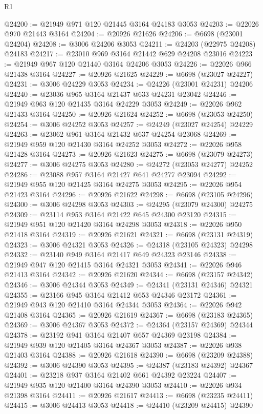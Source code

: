 \begin{lexlean}{R1}
\begin{coremodule}
@24200 := @21949 @971 @120 @21445 @3164 @24183 @3053
@24203 := @22026 @970 @21443 @3164
@24204 := @20926 @21626
@24206 := @6698 (@23001 @24204)
@24208 := @3006 @24206 @3053
@24211 := @24203 (@22975 @24208) @24183
@24217 := @23010 @969 @3164 @21442 @629 @24208 @23016
@24223 := @21949 @967 @120 @21440 @3164 @24206 @3053
@24226 := @22026 @966 @21438 @3164
@24227 := @20926 @21625
@24229 := @6698 (@23027 @24227)
@24231 := @3006 @24229 @3053
@24234 := @24226 (@23001 @24231) @24206
@24240 := @23036 @965 @3164 @21437 @633 @24231 @23042
@24246 := @21949 @963 @120 @21435 @3164 @24229 @3053
@24249 := @22026 @962 @21433 @3164
@24250 := @20926 @21624
@24252 := @6698 (@23053 @24250)
@24254 := @3006 @24252 @3053
@24257 := @24249 (@23027 @24254) @24229
@24263 := @23062 @961 @3164 @21432 @637 @24254 @23068
@24269 := @21949 @959 @120 @21430 @3164 @24252 @3053
@24272 := @22026 @958 @21428 @3164
@24273 := @20926 @21623
@24275 := @6698 (@23079 @24273)
@24277 := @3006 @24275 @3053
@24280 := @24272 (@23053 @24277) @24252
@24286 := @23088 @957 @3164 @21427 @641 @24277 @23094
@24292 := @21949 @955 @120 @21425 @3164 @24275 @3053
@24295 := @22026 @954 @21423 @3164
@24296 := @20926 @21622
@24298 := @6698 (@23105 @24296)
@24300 := @3006 @24298 @3053
@24303 := @24295 (@23079 @24300) @24275
@24309 := @23114 @953 @3164 @21422 @645 @24300 @23120
@24315 := @21949 @951 @120 @21420 @3164 @24298 @3053
@24318 := @22026 @950 @21418 @3164
@24319 := @20926 @21621
@24321 := @6698 (@23131 @24319)
@24323 := @3006 @24321 @3053
@24326 := @24318 (@23105 @24323) @24298
@24332 := @23140 @949 @3164 @21417 @649 @24323 @23146
@24338 := @21949 @947 @120 @21415 @3164 @24321 @3053
@24341 := @22026 @946 @21413 @3164
@24342 := @20926 @21620
@24344 := @6698 (@23157 @24342)
@24346 := @3006 @24344 @3053
@24349 := @24341 (@23131 @24346) @24321
@24355 := @23166 @945 @3164 @21412 @653 @24346 @23172
@24361 := @21949 @943 @120 @21410 @3164 @24344 @3053
@24364 := @22026 @942 @21408 @3164
@24365 := @20926 @21619
@24367 := @6698 (@23183 @24365)
@24369 := @3006 @24367 @3053
@24372 := @24364 (@23157 @24369) @24344
@24378 := @23192 @941 @3164 @21407 @657 @24369 @23198
@24384 := @21949 @939 @120 @21405 @3164 @24367 @3053
@24387 := @22026 @938 @21403 @3164
@24388 := @20926 @21618
@24390 := @6698 (@23209 @24388)
@24392 := @3006 @24390 @3053
@24395 := @24387 (@23183 @24392) @24367
@24401 := @23218 @937 @3164 @21402 @661 @24392 @23224
@24407 := @21949 @935 @120 @21400 @3164 @24390 @3053
@24410 := @22026 @934 @21398 @3164
@24411 := @20926 @21617
@24413 := @6698 (@23235 @24411)
@24415 := @3006 @24413 @3053
@24418 := @24410 (@23209 @24415) @24390

\end{coremodule}
\end{lexlean}
